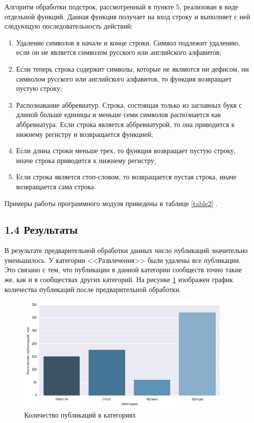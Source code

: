 \documentclass[a4paper]{report}
\begin{document}
	
	Алгоритм обработки подстрок, рассмотренный в пункте 5, реализован в виде отдельной функций.  Данная функция получает на вход строку и выполняет с ней следующую последовательность действий:
	\begin{enumerate}
	\item{ Удаление символов в начале и конце строки. Символ подлежит удалению, если он не является символом русского или английского алфавитов;}
	
	\item{ Если теперь строка содержит символы, которые не являются ни дефисом, ни символом русского или английского алфавитов, то функция возвращает пустую строку; }
	
	\item{ Распознавание аббревиатур. Строка, состоящая только из заглавных букв с длиной больше единицы и меньше семи символов распознается как аббревиатура. Если строка является аббревиатурой, то она приводится к нижнему регистру и возвращается функцией;}
	
	\item{ Если длина строки меньше трех, то функция возвращает пустую строку, иначе строка приводится к нижнему регистру; }
	
	\item{ Если строка является стоп-словом, то возвращается пустая строка, иначе возвращается сама строка.}
	\end{enumerate}
	
	Примеры работы программного модуля приведены в таблице \ref{table2} .
	

	\subsection{1.4 Результаты} 
	
	
	В результате предварительной обработки данных число публикаций значительно уменьшилось. У категории <<Развлечения>> были удалены все публикации. Это связано с тем, что публикации в данной категории сообществ точно такие же, как и в сообществах других категорий. На рисунке \ref{fig:numart1} изображен график количества публикаций после предварительной обработки.
		\newline
		\newline	
		\begin{figure}[h]
		\centering
		\includegraphics[width=400px]
		{imgs/NumArticles1.png}
		\caption{Количество публикаций в категориях}
		\label{fig:numart1}
	\end{figure} 
	
\end{document}
